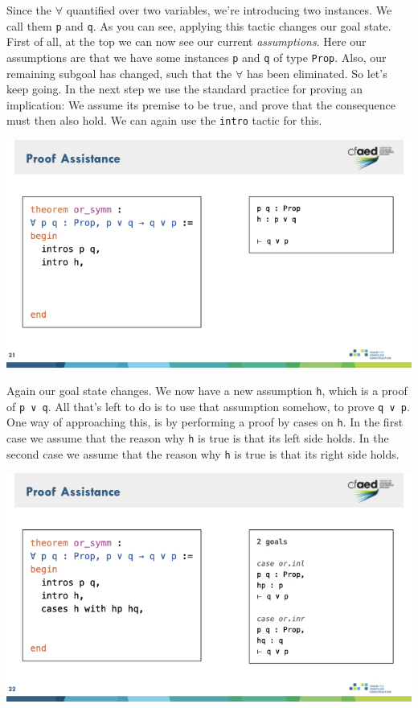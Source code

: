 \documentclass{article}
\begin{document}
Since the $\forall$ quantified over two variables, we're introducing two instances.
We call them \verb|p| and \verb|q|.
As you can see, applying this tactic changes our goal state.
First of all, at the top we can now see our current \emph{assumptions}.
Here our assumptions are that we have some instances \verb|p| and \verb|q| of type \verb|Prop|.
Also, our remaining subgoal has changed, such that the $\forall$ has been eliminated.
So let's keep going.
In the next step we use the standard practice for proving an implication:
We assume its premise to be true, and prove that the consequence must then also hold.
We can again use the \verb|intro| tactic for this.

\begin{center}
    \includegraphics[width=\columnwidth]{Slides/Slide 21.jpeg}
\end{center}

Again our goal state changes.
We now have a new assumption \verb|h|, which is a proof of \verb|p ∨ q|.
All that's left to do is to use that assumption somehow, to prove \verb|q ∨ p|.
One way of approaching this, is by performing a proof by cases on \verb|h|.
In the first case we assume that the reason why \verb|h| is true is that its left side holds.
In the second case we assume that the reason why \verb|h| is true is that its right side holds. 

\begin{center}
    \includegraphics[width=\columnwidth]{Slides/Slide 22.jpeg}
\end{center}
\end{document}
